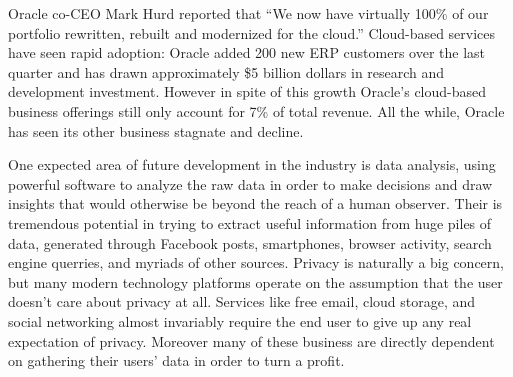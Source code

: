 Oracle co-CEO Mark Hurd reported that ``We now have virtually 100\% of our portfolio rewritten, rebuilt and modernized for the cloud.''\autocite[]{OracleRebuilt}
Cloud-based services have seen rapid adoption: Oracle added 200 new ERP customers over the last quarter and has drawn approximately \$5 billion dollars in research and development investment.\autocite[]{OracleRebuilt}
However in spite of this growth Oracle's cloud-based business offerings still only account for 7\% of total revenue.\autocite[]{OracleNoGrowth}
All the while, Oracle has seen its other business stagnate and decline.\autocite[]{OracleNoGrowth}

One expected area of future development in the industry is data analysis, using powerful software to analyze the raw data in order to make decisions and draw insights that would otherwise be beyond the reach of a human observer.\autocite[]{NextGenBusinessSoftware}
Their is tremendous potential in trying to extract useful information from huge piles of data, generated through Facebook posts, smartphones, browser activity, search engine querries, and myriads of other sources.\autocite[]{NextGenBusinessSoftware}
Privacy is naturally a big concern, but many modern technology platforms operate on the assumption that the user doesn't care about privacy at all.
Services like free email, cloud storage, and social networking almost invariably require the end user to give up any real expectation of privacy.
Moreover many of these business are directly dependent on gathering their users' data in order to turn a profit.\autocite[]{NextGenBusinessSoftware}
